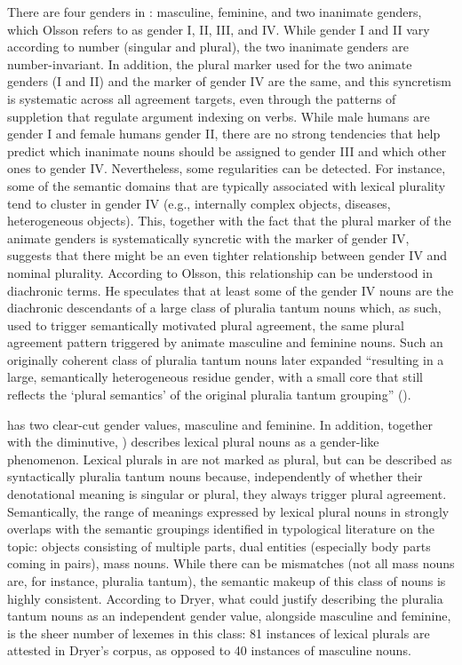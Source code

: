 \documentclass[output=collectionpaper]{langsci/langscibook}
\begin{document}
There are four genders in : masculine, feminine, and two inanimate genders, which Olsson refers to as gender I, II, III, and IV. While gender I and II vary according to number (singular and plural), the two inanimate genders are number-invariant. In addition, the plural marker used for the two animate genders (I and II) and the marker of gender IV are the same, and this syncretism is systematic across all agreement targets, even through the patterns of suppletion that regulate argument indexing on verbs. While male humans are gender I and female humans gender II, there are no strong tendencies that help predict which inanimate nouns should be assigned to gender III and which other ones to gender IV. Nevertheless, some regularities can be detected. For instance, some of the semantic domains that are typically associated with lexical plurality tend to cluster in gender IV (e.g., internally complex objects, diseases, heterogeneous objects). This, together with the fact that the plural marker of the animate genders is systematically syncretic with the marker of gender IV, suggests that there might be an even tighter relationship between gender IV and nominal plurality. According to Olsson, this relationship can be understood in diachronic terms. He speculates that at least some of the gender IV nouns are the diachronic descendants of a large class of pluralia tantum nouns which, as such, used to trigger semantically motivated plural agreement, the same plural agreement pattern triggered by animate masculine and feminine nouns. Such an originally coherent class of pluralia tantum nouns later expanded ``resulting in a large, semantically heterogeneous residue gender, with a small core that still reflects the `plural semantics' of the original pluralia tantum grouping'' ().

 has two clear-cut gender values, masculine and feminine. In addition, together with the diminutive, ) describes lexical plural nouns as a gender-like phenomenon. Lexical plurals in  are not marked as plural, but can be described as syntactically pluralia tantum nouns because, independently of whether their denotational meaning is singular or plural, they always trigger plural agreement. Semantically, the range of meanings expressed by lexical plural nouns in  strongly overlaps with the semantic groupings identified in typological literature on the topic: objects consisting of multiple parts, dual entities (especially body parts coming in pairs), mass nouns. While there can be mismatches (not all mass nouns are, for instance, pluralia tantum), the semantic makeup of this class of nouns is highly consistent. According to Dryer, what could justify describing the  pluralia tantum nouns as an independent gender value, alongside masculine and feminine, is the sheer number of lexemes in this class: 81 instances of lexical plurals are attested in Dryer's corpus, as opposed to 40 instances of masculine nouns.
\end{document}
